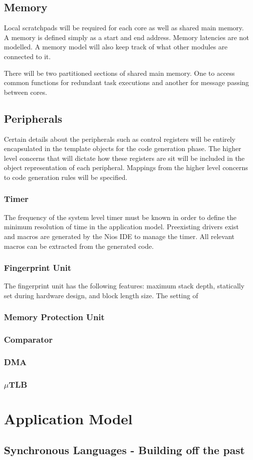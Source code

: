 \documentclass{article}
\begin{document}
\subsection{Memory}
Local scratchpads will be required for each core as well as shared main memory. A memory is defined simply as a start and end address. Memory latencies are not modelled. A memory model will also keep track of what other modules are connected to it.

There will be two partitioned sections of shared main memory. One to access common functions for redundant task executions and another for message passing between cores.

\subsection{Peripherals}
Certain details about the peripherals such as control registers will be entirely encapsulated in the template objects for the code generation phase. The higher level concerns that will dictate how these registers are sit will be included in the object representation of each peripheral. Mappings from the higher level concerns to code generation rules will be specified.

\subsubsection{Timer}
The frequency of the system level timer must be known in order to define the minimum resolution of time in the application model. Preexisting drivers exist and macros are generated by the Nios IDE to manage the timer. All relevant macros can be extracted from the generated code.

\subsubsection{Fingerprint Unit} 
The fingerprint unit has the following features: maximum stack depth, statically set during hardware design, and block length size. The setting of

\subsubsection{Memory Protection Unit}

\subsubsection{Comparator}

\subsubsection{DMA}

\subsubsection{$\mu$TLB}

\section{Application Model}
\subsection{Synchronous Languages - Building off the past}
\end{document}
